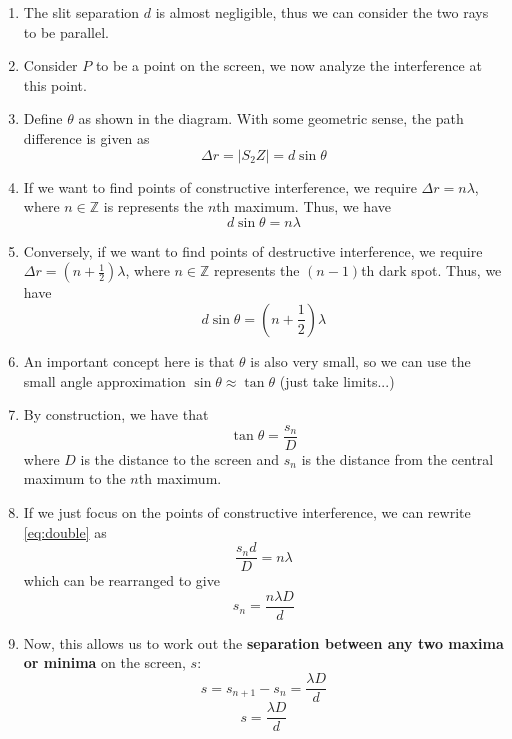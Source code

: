 \documentclass[a4paper,12pt]{article}
\begin{document}
\begin{enumerate}
  \item The slit separation $d$ is almost negligible, thus we can consider the two rays to be parallel.
  \item Consider $P$ to be a point on the screen, we now analyze the interference at this point.
  \item Define $\theta$ as shown in the diagram. With some geometric sense, the path difference is given as
        $$\Delta r = |S_2Z| = d\sin\theta$$
  \item If we want to find points of constructive interference, we require $\Delta r = n\lambda$, where $n \in \mathbb{Z}$ is represents the $n$th maximum. Thus, we have
        \begin{equation}\label{eq:double}
          d\sin\theta = n\lambda
        \end{equation}
  \item Conversely, if we want to find points of destructive interference, we require $\Delta r = (n + \frac{1}{2})\lambda$, where $n \in \mathbb{Z}$ represents the $(n-1)$th dark spot. Thus, we have
        \begin{equation}\label{eq:double2}
          d\sin\theta = (n + \frac{1}{2})\lambda
        \end{equation}
  \item An important concept here is that $\theta$ is also very small, so we can use the small angle approximation $\sin\theta \approx \tan\theta$ (just take limits...)
  \item By construction, we have that $$\tan\theta = \frac{s_n}{D}$$
        where $D$ is the distance to the screen and $s_n$ is the distance from the central maximum to the $n$th maximum.
  \item If we just focus on the points of constructive interference, we can rewrite \cref{eq:double} as
        $$\frac{s_nd}{D} = n\lambda$$
        which can be rearranged to give
        \begin{equation}\label{eq:double3}
          s_n = \frac{n\lambda D}{d}
        \end{equation}
  \item Now, this allows us to work out the \textbf{separation between any two maxima or minima} on the screen, $s$:
        $$s = s_{n + 1} - s_n = \frac{\lambda D}{d}$$
        \begin{equation}
          s = \frac{\lambda D}{d}
        \end{equation}

\end{enumerate}
\end{document}
